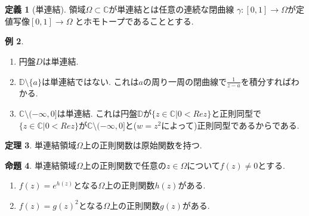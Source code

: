 \documentclass[dvipdfmx,a4paper,11pt]{article}
\newcommand{\C}{\mathbb{C}}
\newcommand{\D}{\mathbb{D}}
\theoremstyle{definition}
\newtheorem{thm}{定理}
\newtheorem{prop}[thm]{命題}
\newtheorem{dfn}[thm]{定義}
\newtheorem{exa}[thm]{例}
\begin{document}
\section{}

\begin{tcolorbox}[
    colback = white,
    colframe = green!35!black,
    fonttitle = \bfseries,
    breakable = true]
    \begin{dfn}[単連結]
領域$\Omega \subset \C$が単連結とは任意の連続な閉曲線
$\gamma : [0,1] \rightarrow \Omega$が定値写像$[0,1] \rightarrow \Omega$
とホモトープであることとする. 
    \end{dfn}
\end{tcolorbox}

\begin{exa}
    \begin{enumerate}
    \setlength{\parskip}{0cm} 
  \setlength{\itemsep}{0cm} 
  \item 円盤$D$は単連結.
  \item $\D \setminus \{ a \}$は単連結ではない. これは$a$の周り一周の閉曲線で$\frac{1}{z - a}$を積分すればわかる.
  \item $\C \setminus (- \infty, 0]$は単連結. これは円盤$\D$が$\{ z \in \C | 0 < Re z\}$と正則同型で$\{ z \in \C | 0 < Re z\}$が$\C \setminus (- \infty, 0]$と($w = z^2$によって)正則同型であるからである. 
  \end{enumerate}
\end{exa}

\begin{tcolorbox}[
    colback = white,
    colframe = green!35!black,
    fonttitle = \bfseries,
    breakable = true]
    \begin{thm}
単連結領域$\Omega$上の正則関数は原始関数を持つ. 
    \end{thm}
\end{tcolorbox}

\begin{tcolorbox}[
    colback = white,
    colframe = green!35!black,
    fonttitle = \bfseries,
    breakable = true]
    \begin{prop}
単連結領域$\Omega$上の正則関数で任意の$z \in \Omega$について$f(z) \neq 0$とする.
    \begin{enumerate}
    \setlength{\parskip}{0cm} 
  \setlength{\itemsep}{0cm} 
  \item $f(z) = e^{h(z)}$となる$\Omega$上の正則関数$h(z)$がある.
  \item $f(z) = g(z)^2$となる$\Omega$上の正則関数$g(z)$がある.
  \end{enumerate}
    \end{prop}
\end{tcolorbox}
\end{document}
